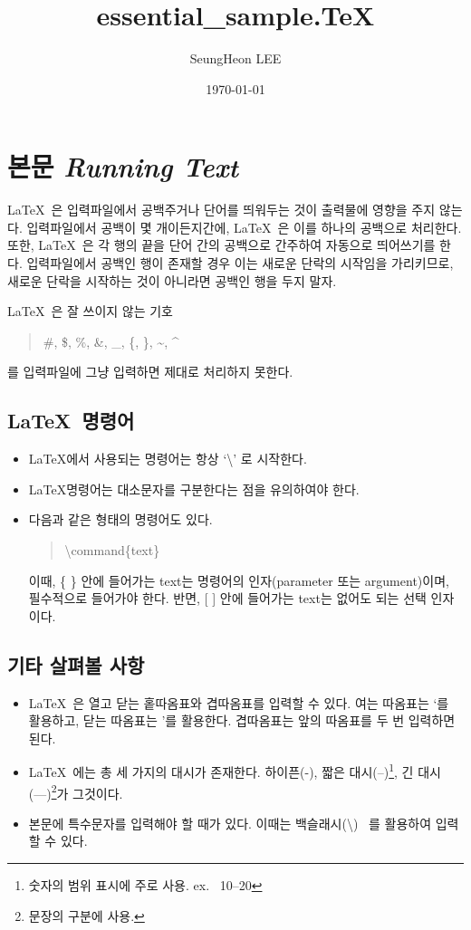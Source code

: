 \documentclass[a4paper, titlepage]{article}
\begin{document}
\title{essential\_sample.\TeX}
\author{SeungHeon LEE}
\date{\today}
\maketitle

\tableofcontents

\newpage
\section{본문 \emph{Running Text}}
\LaTeX \ 은 입력파일에서 공백주거나 단어를 띄워두는 것이 출력물에 영향을 주지 않는다. 입력파일에서 공백이 몇 개이든지간에, \LaTeX \ 은 이를 하나의 공백으로 처리한다. 
또한, \LaTeX \ 은 각 행의 끝을 단어 간의 공백으로 간주하여 자동으로 띄어쓰기를 한다. 
입력파일에서 공백인 행이 존재할 경우 이는 새로운 단락의 시작임을 가리키므로, 새로운 단락을 시작하는 것이 아니라면 공백인 행을 두지 말자. 

\LaTeX \ 은 잘 쓰이지 않는 기호 
\begin{quote}
\#, \$, \%, \&, \_, \{, \}, \textasciitilde, \textasciicircum
\end{quote}
를 입력파일에 그냥 입력하면 제대로 처리하지 못한다.

\subsection{\LaTeX \ 명령어}
\begin{itemize}
    \item \LaTeX 에서 사용되는 명령어는 항상 `\textbackslash' 로 시작한다.  
    \item \LaTeX 명령어는 대소문자를 구분한다는 점을 유의하여야 한다.
    \item 다음과 같은 형태의 명령어도 있다. 
    \begin{quote}
        \textbackslash command\{text\}  
    \end{quote}
    이때, \{ \} 안에 들어가는 text는 명령어의 인자(parameter 또는 argument)이며, 필수적으로 들어가야 한다. 
    반면, [ ] 안에 들어가는 text는 없어도 되는 선택 인자이다. 
\end{itemize}

\subsection{기타 살펴볼 사항}
\begin{itemize}
    \item \LaTeX \ 은 열고 닫는 홑따옴표와 겹따옴표를 입력할 수 있다. 여는 따옴표는 `를 활용하고, 닫는 따옴표는 '를 활용한다. 겹따옴표는 앞의 따옴표를 두 번 입력하면 된다. 
    \item \LaTeX \ 에는 총 세 가지의 대시가 존재한다. 하이픈(-), 짧은 대시(--)\footnote{숫자의 범위 표시에 주로 사용. ex. \ 10--20}, 긴 대시(---)\footnote{문장의 구분에 사용.}가 그것이다.  
    \item 본문에 특수문자를 입력해야 할 때가 있다. 이때는 백슬래시(\textbackslash) \ 를 활용하여 입력할 수 있다. 
\end{itemize}
\end{document}

